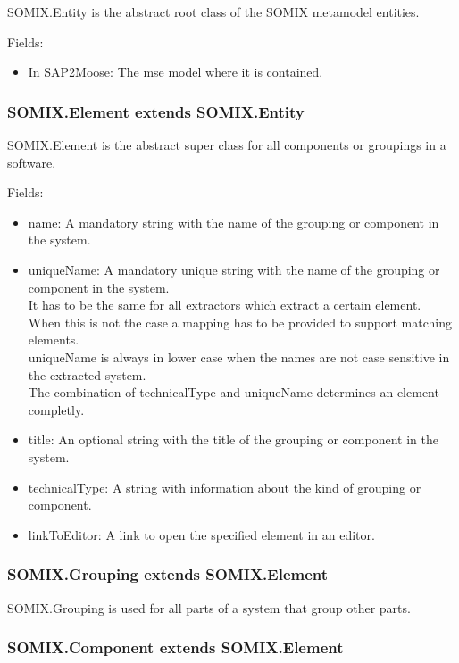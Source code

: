 \documentclass[preprint,12pt]{elsarticle}
\begin{document}
SOMIX.Entity is the abstract root class of the SOMIX metamodel entities.

Fields:
\begin{itemize}
\item In SAP2Moose: The mse model where it is contained.
\end{itemize}


\subsubsection{SOMIX.Element extends SOMIX.Entity}

SOMIX.Element is the abstract super class for all components or groupings in a software.

Fields:
\begin{itemize}
\item name: A mandatory string with the name of the grouping or component in the system.
\item uniqueName: A mandatory unique string with the name of the grouping or component in the system.\\
It has to be the same for all extractors which extract a certain element. When this is not the case a mapping has to be provided to support matching elements.\\
uniqueName is always in lower case when the names are not case sensitive in the extracted system.\\
The combination of technicalType and uniqueName determines an element completly.
\item title: An optional string with the title of the grouping or component in the system.
\item technicalType: A string with information about the kind of grouping or component.
\item linkToEditor: A link to open the specified element in an editor.
\end{itemize}



\subsubsection{SOMIX.Grouping extends SOMIX.Element}

SOMIX.Grouping is used for all parts of a system that group other parts.

\subsubsection{SOMIX.Component extends SOMIX.Element}
\end{document}
